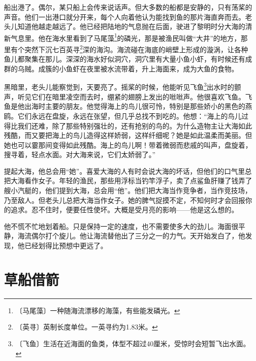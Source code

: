 \documentclass[12pt,UTF-8,openany]{ctexbook}
\begin{document}
\begin{Large}
    
    船出港了。偶尔，某只船上会传来说话声。但大多数的船都是安静的，只有荡桨的声音。他们一出港口就分开来，每个人向着他认为能找到鱼的那片海直奔而去。老头儿知道他越走越远了。他已经把陆地的气息抛在后面，驶进了黎明时分大海的清新气息里。他在海水里看到了马尾藻\footnote{〔马尾藻〕一种随海流漂移的海藻，有些能发磷光。}的磷光，那是被渔民叫做“大井”的地方，那里有个突然下沉七百英寻\footnote{〔英寻〕英制长度单位。一英寻约为1.83米。}深的海沟。海流碰在海底的峭壁上形成的漩涡，让各种鱼儿都聚集在那儿。深深的海水好似洞穴，洞穴里有大量小鱼小虾，有时候还有成群的乌贼。成簇的小鱼虾在夜里被水流带着，升上海面来，成为大鱼的食物。
    
    黑暗里，老头儿能察觉到，天要亮了。摇桨的时候，他能听见飞鱼\footnote{〔飞鱼〕生活在近海面的鱼类，体型不超过40厘米，受惊时会短暂飞出水面。}出水时的颤声，听见它们在暗里凌空而去时，绷紧的翅膀上发出的咝咝声。他很喜欢飞鱼。飞鱼是他出海时主要的朋友。他觉得海上的鸟儿很可怜，特别是那些娇小的黑色的燕鸥。它们永远在盘旋，永远在张望，但几乎总找不到吃的。他想：“海上的鸟儿过得比我们还难，除了那些特别强壮的，还有抢别的鸟的。为什么造物主让大海如此残酷，而又要把海上的鸟儿造得这样娇弱，这样纤细呢？她是如此温柔而美丽。但她也可以霎那间变得如此残酷。海上的鸟儿啊！带着微弱而悲戚的叫声，盘旋着，搜寻着，轻点水面。对大海来说，它们太娇弱了。”
    
    提起大海，他总会用“她”。喜爱大海的人有时会说大海的坏话，但他们的口气里总把大海看作女子。年轻的渔民，那些用浮标当钓竿浮子，卖了点鲨鱼肝赚了钱弄了艘小汽艇的，他们提到大海，总会用“他”。他们把大海当作竞争者，当作竞技场，乃至敌人。但老头儿总把大海当作女子。她的脾气捉摸不定，不知何时才会回报你的追求。忍不住时，便要任性使坏。大概是受月亮的影响——他是这么想的。
    
    他不慌不忙地划着船。只是保持一定的速度，也不需要使多大的劲儿。海面很平静，海流偶尔打个旋儿。他让海流替他出了三分之一的力气。天开始发白了，他发现，他已经划得比预想中更远了。
    
\end{Large}

\chapter{草船借箭}
\end{document}
